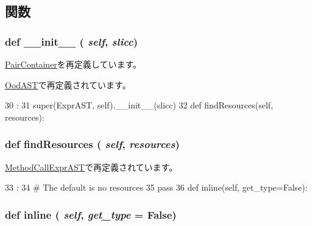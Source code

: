 \subsection{関数}
\hypertarget{classslicc_1_1ast_1_1ExprAST_1_1ExprAST_ac775ee34451fdfa742b318538164070e}{
\subsubsection[{\_\-\_\-init\_\-\_\-}]{\setlength{\rightskip}{0pt plus 5cm}def \_\-\_\-init\_\-\_\- ( {\em self}, \/   {\em slicc})}}
\label{classslicc_1_1ast_1_1ExprAST_1_1ExprAST_ac775ee34451fdfa742b318538164070e}


\hyperlink{classslicc_1_1util_1_1PairContainer_ac775ee34451fdfa742b318538164070e}{PairContainer}を再定義しています。

\hyperlink{classslicc_1_1ast_1_1OodAST_1_1OodAST_ac775ee34451fdfa742b318538164070e}{OodAST}で再定義されています。


\begin{DoxyCode}
30                              :
31         super(ExprAST, self).__init__(slicc)
32 
    def findResources(self, resources):
\end{DoxyCode}
\hypertarget{classslicc_1_1ast_1_1ExprAST_1_1ExprAST_abd195c795639b490ba2de4c1246105f1}{
\subsubsection[{findResources}]{\setlength{\rightskip}{0pt plus 5cm}def findResources ( {\em self}, \/   {\em resources})}}
\label{classslicc_1_1ast_1_1ExprAST_1_1ExprAST_abd195c795639b490ba2de4c1246105f1}


\hyperlink{classslicc_1_1ast_1_1MethodCallExprAST_1_1MethodCallExprAST_abd195c795639b490ba2de4c1246105f1}{MethodCallExprAST}で再定義されています。


\begin{DoxyCode}
33                                       :
34         # The default is no resources
35         pass
36 
    def inline(self, get_type=False):
\end{DoxyCode}
\hypertarget{classslicc_1_1ast_1_1ExprAST_1_1ExprAST_a02c03119bb4045f46aedfb6b5271bdab}{
\subsubsection[{inline}]{\setlength{\rightskip}{0pt plus 5cm}def inline ( {\em self}, \/   {\em get\_\-type} = {\ttfamily False})}}
\label{classslicc_1_1ast_1_1ExprAST_1_1ExprAST_a02c03119bb4045f46aedfb6b5271bdab}



